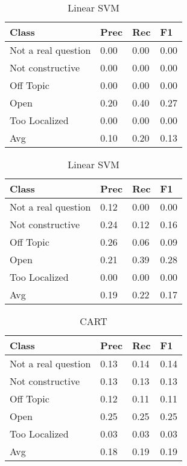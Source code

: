 \begin{table}[!htpb]
\centering
\begin{minipage}{.5\linewidth}
    \begin{tabular}{|l|l|l|l|} \hline
    \textbf{Class}& \textbf{Prec} & \textbf{Rec} & \textbf{F1} \\ \hline
    Not a real question & 0.00      & 0.00   & 0.00     \\
    Not constructive    & 0.00      & 0.00   & 0.00     \\
    Off Topic           & 0.00      & 0.00   & 0.00     \\
    Open                & 0.20      & 0.40   & 0.27     \\
    Too Localized       & 0.00      & 0.00   & 0.00     \\ \hline
    Avg                 & 0.10      & 0.20   & 0.13   \\ \hline   
    \end{tabular}
    \caption{Radial SVM}
    \label{tab2:rsvm}
\end{minipage}%
\begin{minipage}{.5\linewidth}
    \begin{tabular}{|l|l|l|l|} \hline
    \textbf{Class}& \textbf{Prec} & \textbf{Rec} & \textbf{F1} \\ \hline
    Not a real question & 0.12      & 0.00   & 0.00     \\
    Not constructive    & 0.24      & 0.12   & 0.16     \\
    Off Topic           & 0.26      & 0.06   & 0.09     \\
    Open                & 0.21      & 0.39   & 0.28     \\
    Too Localized       & 0.00      & 0.00   & 0.00     \\ \hline
    Avg                 & 0.19      & 0.22   & 0.17   \\ \hline  
    \end{tabular}
    \caption{Linear SVM}
    \label{tab2:lsvm}
\end{minipage}

\end{table}

\begin{table}[!htpb]
\centering
\begin{tabular}{|l|l|l|l|} \hline
\textbf{Class}& \textbf{Prec} & \textbf{Rec} & \textbf{F1} \\ \hline
Not a real question & 0.13      & 0.14   & 0.14     \\
Not constructive    & 0.13      & 0.13   & 0.13     \\
Off Topic           & 0.12     & 0.11   & 0.11     \\
Open                & 0.25      & 0.25   & 0.25     \\
Too Localized       & 0.03      & 0.03   & 0.03     \\ \hline
Avg                 & 0.18      & 0.19   & 0.19   \\ \hline  
\end{tabular}
\caption{CART}
\label{tab2:cart}
\end{table}

